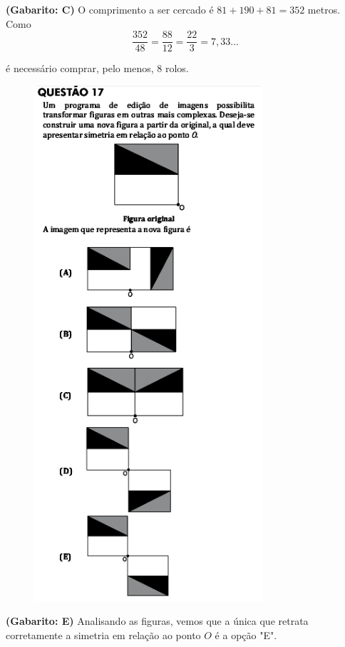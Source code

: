 \documentclass[a4paper]{article}
\begin{document}
\par\textbf{(Gabarito: C)} O comprimento a ser cercado é $81+190+81 = 352$ metros. Como
\begin{equation*}
\frac{352}{48} = \frac{88}{12} = \frac{22}{3} = 7,33...
\end{equation*}
\par\vspace{0.3cm} é necessário comprar, pelo menos, $8$ rolos.
\begin{figure}[H]
	\begin{center}
		\includegraphics[width=8.5cm]{L5Q17.png}
	\end{center}
\end{figure}
\par\textbf{(Gabarito: E)} Analisando as figuras, vemos que a única que retrata corretamente a simetria em relação ao ponto $O$ é a opção "E".
\end{document}
